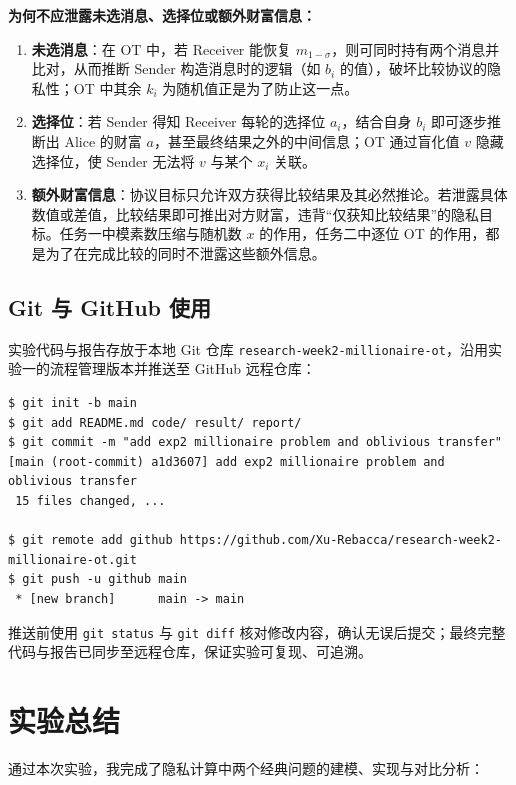 \documentclass{SYSUReport}
\begin{document}
\textbf{为何不应泄露未选消息、选择位或额外财富信息：}

\begin{enumerate}
    \item \textbf{未选消息}：在 OT 中，若 Receiver 能恢复 $m_{1-\sigma}$，则可同时持有两个消息并比对，从而推断 Sender 构造消息时的逻辑（如 $b_i$ 的值），破坏比较协议的隐私性；OT 中其余 $k_i$ 为随机值正是为了防止这一点。
    \item \textbf{选择位}：若 Sender 得知 Receiver 每轮的选择位 $a_i$，结合自身 $b_i$ 即可逐步推断出 Alice 的财富 $a$，甚至最终结果之外的中间信息；OT 通过盲化值 $v$ 隐藏选择位，使 Sender 无法将 $v$ 与某个 $x_i$ 关联。
    \item \textbf{额外财富信息}：协议目标只允许双方获得比较结果及其必然推论。若泄露具体数值或差值，比较结果即可推出对方财富，违背“仅获知比较结果”的隐私目标。任务一中模素数压缩与随机数 $x$ 的作用，任务二中逐位 OT 的作用，都是为了在完成比较的同时不泄露这些额外信息。
\end{enumerate}

\subsection{Git 与 GitHub 使用}

实验代码与报告存放于本地 Git 仓库 \texttt{research-week2-millionaire-ot}，沿用实验一的流程管理版本并推送至 GitHub 远程仓库：

\begin{lstlisting}[caption={Git 初始化的版本管理流程}]
$ git init -b main
$ git add README.md code/ result/ report/
$ git commit -m "add exp2 millionaire problem and oblivious transfer"
[main (root-commit) a1d3607] add exp2 millionaire problem and oblivious transfer
 15 files changed, ...

$ git remote add github https://github.com/Xu-Rebacca/research-week2-millionaire-ot.git
$ git push -u github main
 * [new branch]      main -> main
\end{lstlisting}

推送前使用 \texttt{git status} 与 \texttt{git diff} 核对修改内容，确认无误后提交；最终完整代码与报告已同步至远程仓库，保证实验可复现、可追溯。

\section{实验总结}

通过本次实验，我完成了隐私计算中两个经典问题的建模、实现与对比分析：
\end{document}
